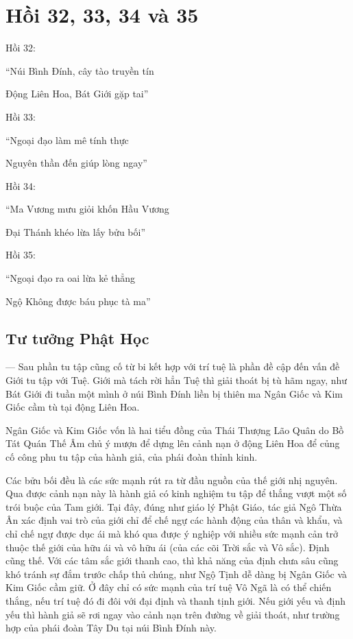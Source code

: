 \chapter{Hồi 32, 33, 34 và 35} %
\label{cha:hoi_33_34}

Hồi 32:

\begin{itshape}
``Núi Bình Đính, cây tào truyền tín

Động Liên Hoa, Bát Giới gặp tai''
\end{itshape}

Hồi 33:

\begin{itshape}
``Ngoại đạo làm mê tính thực

Nguyên thần đến giúp lòng ngay''
\end{itshape}

Hồi 34:

\begin{itshape}
``Ma Vương mưu giỏi khốn Hầu Vương

Đại Thánh khéo lừa lấy bửu bối''
\end{itshape}

Hồi 35:

\begin{itshape}
``Ngoại đạo ra oai lừa kẻ thẳng

Ngộ Không được báu phục tà ma''
\end{itshape}

\section{Tư tưởng Phật Học} %
\label{sec:33_34_phat_hoc}

— Sau phần tu tập cũng cố từ bi kết hợp với trí tuệ là phần đề cập đến vấn đề Giới tu tập với Tuệ. Giới mà tách rời hẳn Tuệ thì giải thoát bị tù hãm ngay, như Bát Giới đi tuần một mình ở núi Bình Đính liền bị thiên ma Ngân Giốc và Kim Giốc cầm tù tại động Liên Hoa.

Ngân Giốc và Kim Giốc vốn là hai tiểu đồng của Thái Thượng Lão Quân do Bồ Tát Quán Thế Âm chủ ý mượn để dựng lên cảnh nạn ở động Liên Hoa để củng cố công phu tu tập của hành giả, của phái đoàn thỉnh kinh.

Các bửu bối đều là các sức mạnh rút ra từ đầu nguồn của thế giới nhị nguyên. Qua được cảnh nạn này là hành giả có kinh nghiệm tu tập để thắng vượt một số trói buộc của Tam giới. Tại đây, đúng như giáo lý Phật Giáo, tác giả Ngô Thừa Ân xác định vai trò của giới chỉ để chế ngự các hành động của thân và khẩu, và chỉ chế ngự được dục ái mà khó qua được ý nghiệp với nhiều sức mạnh cản trở thuộc thế giới của hữu ái và vô hữu ái (của các cõi Trời sắc và Vô sắc). Định cũng thế. Với các tâm sắc giới thanh cao, thì khả năng của định chưa sâu cũng khó tránh sự đắm trước chấp thủ chúng, như Ngộ Tịnh dễ dàng bị Ngân Giốc và Kim Giốc cầm giữ. Ở đây chỉ có sức mạnh của trí tuệ Vô Ngã là có thể chiến thắng, nếu trí tuệ đó đi đôi với đại định và thanh tịnh giới. Nếu giới yếu và định yếu thì hành giả sẽ rơi ngay vào cảnh nạn trên đường về giải thoát, như trường hợp của phái đoàn Tây Du tại núi Bình Đính này.

